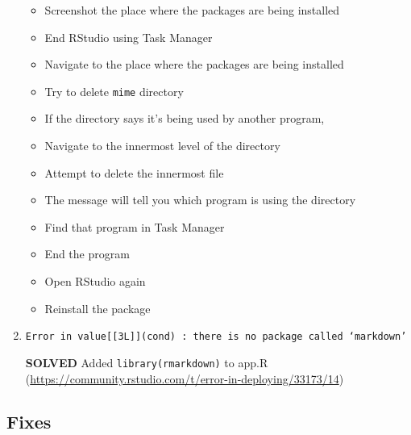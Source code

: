 \documentclass[]{article}
\providecommand{\tightlist}{%
  \setlength{\itemsep}{0pt}\setlength{\parskip}{0pt}}
\begin{document}
\begin{enumerate}
  \begin{itemize}
  \tightlist
  \item
    Screenshot the place where the packages are being installed
  \item
    End RStudio using Task Manager
  \item
    Navigate to the place where the packages are being installed
  \item
    Try to delete \texttt{mime} directory
  \item
    If the directory says it's being used by another program,
  \item
    Navigate to the innermost level of the directory
  \item
    Attempt to delete the innermost file
  \item
    The message will tell you which program is using the directory
  \item
    Find that program in Task Manager
  \item
    End the program
  \item
    Open RStudio again
  \item
    Reinstall the package
  \end{itemize}
\item
  \texttt{Error\ in\ value{[}{[}3L{]}{]}(cond)\ :\ there\ is\ no\ package\ called\ ‘markdown’}

  \textbf{SOLVED} Added \texttt{library(rmarkdown)} to app.R
  (\url{https://community.rstudio.com/t/error-in-deploying/33173/14})
\end{enumerate}

\subsection{Fixes}\label{fixes}
\end{document}
